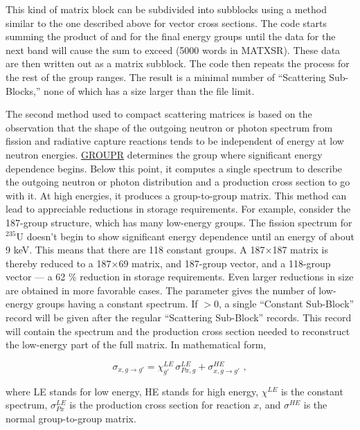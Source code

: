 This kind of matrix block can be subdivided into subblocks using a method
similar to the one described above for vector cross sections.  The code
starts summing the product of  and  for the
final energy groups until the data for the next band will cause the sum
to exceed  (5000 words in MATXSR).  These data are
then written out as a matrix subblock.  The code then repeats the process
for the rest of the group ranges.  The result is a minimal number of
``Scattering Sub-Blocks,'' none of which has a size larger than the
file limit.

The second method used to compact scattering matrices is based on the
observation that the shape of the outgoing neutron or photon spectrum
from fission and radiative capture reactions tends to be independent of
energy at low neutron energies. \hyperlink{sGROUPRhy}{GROUPR}
determines the group where
significant energy dependence begins.  Below this point, it computes a
single spectrum to describe the outgoing neutron or photon distribution
and a production cross section to go with it.  At high energies, it
produces a group-to-group matrix.  This method can lead to appreciable
reductions in storage requirements.  For example, consider the 187-group
structure, which has many low-energy groups.  The fission spectrum
for $^{235}$U doesn't begin to show significant energy dependence until
an energy of about 9 keV.  This means that there are  118 constant
groups.  A 187$\times$187 matrix is thereby reduced to a 187$\times$69
matrix, and 187-group vector, and a 118-group vector --- a 62 \% reduction in
storage requirements.  Even larger reductions in size are obtained
in more favorable cases.  The parameter  gives the number
of low-energy groups having a constant spectrum.  If $>$0,
a single ``Constant Sub-Block'' record will be given after the regular
``Scattering Sub-Block'' records.  This record will contain the spectrum
 and the production cross section  needed to
reconstruct the low-energy part of the full matrix.  In mathematical form,

\begin{equation}
   \sigma_{x,g{\rightarrow}g'} = \chi^{LE}_{g'}
      \,\sigma^{LE}_{Px,g} + \sigma^{HE}_{x,g{\rightarrow}g'} \,\,,
\end{equation}
\vspace{1 pt}

\noindent
where LE stands for low energy, HE stands for high energy, $\chi^{LE}$ is
the constant spectrum, $\sigma^{LE}_{Px}$ is the production cross section
for reaction $x$, and $\sigma^{HE}$ is the normal group-to-group matrix.

